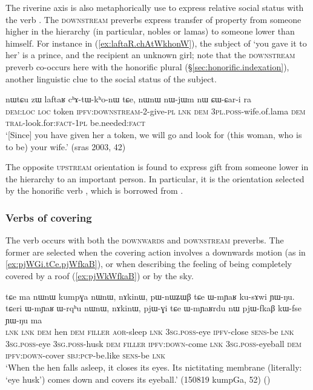 The riverine axis is also metaphorically use to express relative social status with the verb . The \textsc{downstream} preverbs express transfer of property from someone higher in the hierarchy (in particular, nobles or lamas) to someone lower than himself. For instance in (\ref{ex:laftaR.chAtWkhonW}), the subject of  `you gave it to her' is a prince, and the recipient an unknown girl; note that the \textsc{downstream} preverb co-occurs here with the honorific plural (§\ref{sec:honorific.indexation}), another linguistic clue to the social status of the subject.

\begin{exe}
\ex \label{ex:laftaR.chAtWkhonW}
\gll nɯtɕu zɯ laftaʁ cʰɤ-tɯ-kʰo-nɯ tɕe, nɯnɯ nɯ-jɯm nɯ ɕɯ-ɕar-i ra \\
\textsc{dem}:\textsc{loc} \textsc{loc} token \textsc{ipfv}:\textsc{downstream}-2-give-\textsc{pl} \textsc{lnk} \textsc{dem} \textsc{3pl}.\textsc{poss}-wife.of.lama \textsc{dem} \textsc{tral}-look.for:\textsc{fact}-\textsc{1pl} be.needed:\textsc{fact} \\
\glt `[Since] you have given her a token, we will go and look for (this woman, who is to be) your wife.' (sras 2003, 42)
\end{exe}

The opposite \textsc{upstream} orientation is found to express gift from someone lower in the hierarchy to an important person. In particular, it is the orientation selected by the honorific verb , which is borrowed from .
 
\subsubsection{Verbs of covering} \label{sec:preverb.cover}
The verb  occurs with both the \textsc{downwards} and \textsc{downstream} preverbs. The former are selected when the covering action involves a downwards motion (as in \ref{ex:pjWGi.tCe.pjWfkaB}), or when describing the feeling of being completely covered by a roof (\ref{ex:pjWkWfkaB}) or by the sky.

\begin{exe}
\ex \label{ex:pjWGi.tCe.pjWfkaB}
\gll  tɕe ma nɯnɯ kumpɣa nɯnɯ, nɤkinɯ, pɯ-nɯʑɯβ tɕe ɯ-mɲaʁ ku-sɤwi ɲɯ-ŋu. tɕeri ɯ-mɲaʁ ɯ-rqʰu nɯnɯ, nɤkinɯ, pjɯ-ɣi tɕe ɯ-mɲaʁrdu nɯ pjɯ-fkaβ kɯ-fse ɲɯ-ŋu ma \\
\textsc{lnk} \textsc{lnk} \textsc{dem} hen \textsc{dem} \textsc{filler} \textsc{aor}-sleep \textsc{lnk} \textsc{3sg}.\textsc{poss}-eye \textsc{ipfv}-close \textsc{sens}-be \textsc{lnk} \textsc{3sg}.\textsc{poss}-eye \textsc{3sg}.\textsc{poss}-husk \textsc{dem} \textsc{filler} \textsc{ipfv}:\textsc{down}-come \textsc{lnk} \textsc{3sg}.\textsc{poss}-eyeball \textsc{dem} \textsc{ipfv}:\textsc{down}-cover \textsc{sbj}:\textsc{pcp}-be.like \textsc{sens}-be \textsc{lnk} \\
\glt `When the hen falls asleep, it closes its eyes. Its nictitating membrane (literally: `eye husk') comes down and covers its eyeball.' (150819 kumpGa, 52) ()
\end{exe}

